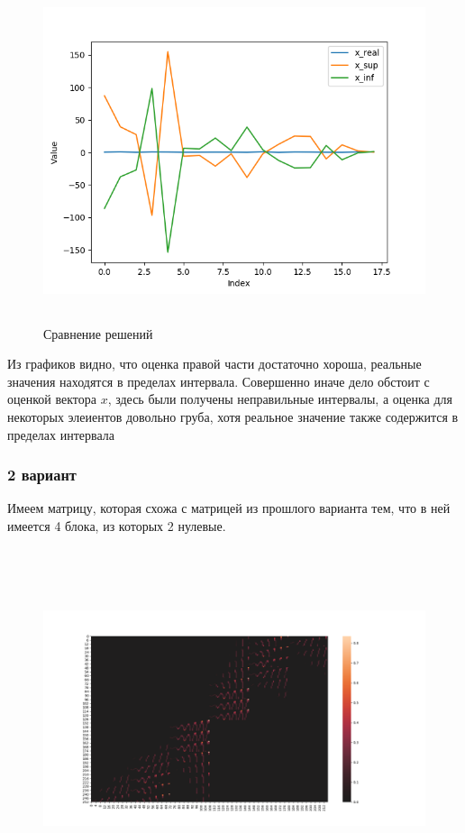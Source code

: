 \documentclass[12pt,a4paper]{scrartcl}
\begin{document}
\begin{figure}[H]
    \centering
    \includegraphics[width=14cm, height=10cm]{fig/x_comp_1.png}
	\caption{Сравнение решений}
\end{figure}

Из графиков видно, что оценка правой части достаточно хороша, реальные значения находятся в пределах интервала. Совершенно иначе дело обстоит с оценкой вектора $x$, здесь были получены неправильные интервалы, а оценка для некоторых элеиентов довольно груба, хотя реальное значение также содержится в пределах интервала

\subsubsection{2 вариант}

Имеем матрицу, которая схожа с матрицей из прошлого варианта тем, что в ней имеется 4 блока, из которых 2 нулевые. 

 \begin{figure}[H]
    \centering
    \includegraphics[width=14cm, height=10cm]{fig/matrix_2.png}
\end{figure}
\end{document}

